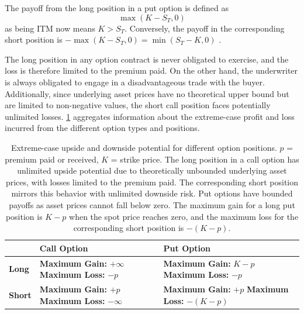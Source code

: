 \documentclass[english,12pt,a4paper,pdftex,sci,utf8]{aaltothesis}
\begin{document}
The payoff from the long position in a put option is defined as
\begin{equation}
    \max(K-S_T,0)
\label{eq:long_put_payoff}
\end{equation}
as being ITM now means $K > S_T$. Conversely, the payoff in the corresponding short position is $-\max(K-S_T,0) = \min(S_T-K,0)$ \cite{hull2016options}.

The long position in any option contract is never obligated to exercise, and the loss is therefore limited to the premium paid. On the other hand, the underwriter is always obligated to engage in a disadvantageous trade with the buyer. Additionally, since underlying asset prices have no theoretical upper bound but are limited to non-negative values, the short call position faces potentially unlimited losses. \cref{tab:options_table} aggregates information about the extreme-case profit and loss incurred from the different option types and positions.

\begin{table}[!htb]
\centering
\caption{Extreme-case upside and downside potential for different option positions. $p$ = premium paid or received, $K$ = strike price. The long position in a call option has unlimited upside potential due to theoretically unbounded underlying asset prices, with losses limited to the premium paid. The corresponding short position mirrors this behavior with unlimited downside risk. Put options have bounded payoffs as asset prices cannot fall below zero. The maximum gain for a long put position is $K-p$ when the spot price reaches zero, and the maximum loss for the corresponding short position is $-(K-p)$.}\label{tab:options_table}
\begin{tabular}{|l|p{5cm}|p{5cm}|}
\hline
\textbf{} & \textbf{Call Option} & \textbf{Put Option} \\
\hline
\textbf{Long} & \textbf{Maximum Gain:} $+\infty$
\newline \textbf{Maximum Loss:} $-p$ & \textbf{Maximum Gain:} $K-p$
\newline \textbf{Maximum Loss:} $-p$ \\
\hline
\textbf{Short} & \textbf{Maximum Gain:} $+p$
\newline \textbf{Maximum Loss:} $-\infty$ & \textbf{Maximum Gain:} $+p$
\newline \textbf{Maximum Loss:} $-(K-p)$ \\
\hline
\end{tabular}
\end{table}
\end{document}
